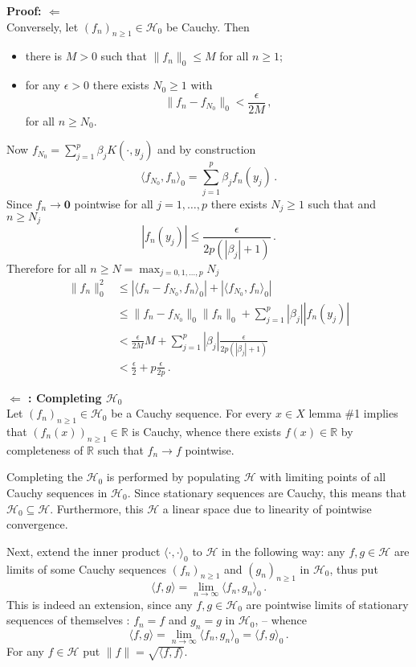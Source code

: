 \documentclass[a4paper]{article}
\newcommand{\Real}{\mathbb{R}}
\newcommand{\nil}{\mathbf{0}}
\newcommand{\Hcal}{\mathcal{H}}
\begin{document}
\noindent\textbf{Proof: $\Leftarrow$} \hfill\\
Conversely, let $(f_n)_{n\geq1}\in \Hcal_0$ be Cauchy. Then \begin{itemize}
	\item there is $M>0$ such that $\|f_n\|_0\leq M$ for all $n\geq 1$;
	\item for any $\epsilon>0$ there exists $N_0\geq1$ with
		\[ \|f_n - f_{N_0} \|_0 < \frac{\epsilon}{2M}\,, \]
		for all $n\geq N_0$.
\end{itemize}
Now $f_{N_0} = \sum_{j=1}^p \beta_j K(\cdot,y_j)$ and by construction
\[ \langle f_{N_0}, f_n \rangle_0 = \sum_{j=1}^p \beta_j f_n(y_j)\,. \]
Since $f_n \to \nil$ pointwise for all $j=1,\ldots,p$ there exists $N_j\geq 1$
such that and $n\geq N_j$
\[ |f_n(y_j)| \leq \frac{\epsilon}{2 p ( |\beta_j| + 1 ) }\,. \]
Therefore for all $n \geq N = \max_{j=0,1,\ldots,p}N_j$
\begin{align*}
	\|f_n\|_0^2
	& \leq |\langle f_n-f_{N_0},f_n \rangle_0| + |\langle f_{N_0}, f_n \rangle_0| \\
	& \leq \|f_n-f_{N_0}\|_0 \|f_n\|_0 + \sum_{j=1}^p |\beta_j| |f_n(y_j)| \\
	& < \frac{\epsilon}{2M} M + \sum_{j=1}^p |\beta_j| \frac{\epsilon}{2 p ( |\beta_j| + 1 ) }\\
	& < \frac{\epsilon}{2} + p\frac{\epsilon}{2p}\,.
\end{align*}

\noindent \textbf{ $\Leftarrow$ : Completing $\Hcal_0$}\hfill\\
Let $(f_n)_{n\geq1}\in \Hcal_0$ be a Cauchy sequence. For every $x\in X$ lemma \#1
implies that $(f_n(x))_{n\geq1}\in\Real$ is Cauchy, whence there exists $f(x)\in \Real$
by completeness of $\Real$ such that $f_n\to f$ pointwise.

Completing the $\Hcal_0$ is performed by populating $\Hcal$ with limiting points
of all Cauchy sequences in $\Hcal_0$. Since stationary sequences are Cauchy, this
means that $\Hcal_0\subseteq \Hcal$. Furthermore, this $\Hcal$ a linear space due to
linearity of pointwise convergence.

Next, extend the inner product $\langle\cdot,\cdot\rangle_0$ to $\Hcal$ in the following
way: any $f,g\in \Hcal$ are limits of some Cauchy sequences $(f_n)_{n\geq1}$ and
$(g_n)_{n\geq1}$ in $\Hcal_0$, thus put
\[
\langle f, g \rangle = \lim_{n\to \infty} \langle f_n, g_n \rangle_0\,.
\]
This is indeed an extension, since any $f, g \in \Hcal_0$ are pointwise limits of
stationary sequences of themselves : $f_n=f$ and $g_n=g$ in $\Hcal_0$, -- whence
\[
\langle f, g\rangle
= \lim_{n\to \infty} \langle f_n, g_n \rangle_0
= \langle f, g \rangle_0\,.
\]
For any $f\in \Hcal$ put $\|f\| = \sqrt{ \langle f,f\rangle}$.
\end{document}
